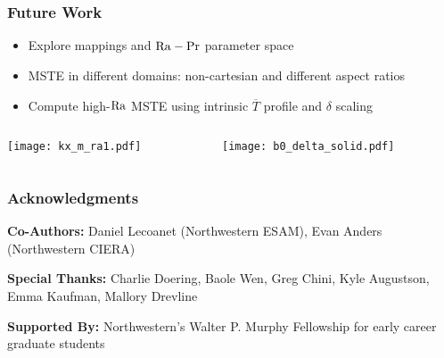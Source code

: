 \section{}
\begin{frame}[fragile]
    \frametitle{Future Work}

    \begin{itemize}
        \item Explore mappings and $\rm{Ra}-\rm{Pr}$ parameter space\newline 

        \item MSTE in different domains: non-cartesian and different aspect ratios\newline 
        
        \item Compute high-$\rm{Ra}$ MSTE using intrinsic $\overline{T}$ profile and $\delta$ scaling
    \end{itemize}
    \begin{columns}[T]
        \begin{column}{.3\textwidth}
            {\texttt{[image: kx\_m\_ra1.pdf]}}
        \end{column}
        \begin{column}{.3\textwidth}
            {\texttt{[image: b0\_delta\_solid.pdf]}}
        \end{column}
    \end{columns}
\end{frame}

\begin{frame}[fragile]
    \frametitle{Acknowledgments}

    \begin{description}
        \item{\textbf{Co-Authors: }} Daniel Lecoanet (Northwestern ESAM), Evan Anders (Northwestern CIERA)\newline
        
        \item{\textbf{Special Thanks: }} Charlie Doering, Baole Wen, Greg Chini, Kyle Augustson, Emma Kaufman, Mallory Drevline\newline

        \item{\textbf{Supported By:}} Northwestern's Walter P. Murphy Fellowship for early career graduate students\newline
    \end{description}
\end{frame}
